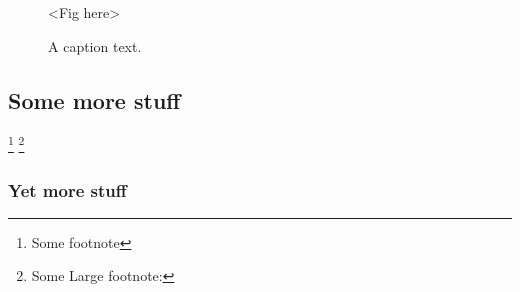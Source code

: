 \documentclass[english]{ufsc-thesis-rn46-2019}
\begin{document}
\lipsum[1]

\lipsum[1]

\begin{figure}[tb]
  \centering
  \caption{\footnotesize A caption text.}
  \label{fig:f}
  \lipsum[1]

  <Fig here> 
\end{figure}


\lipsum[1]

\lipsum[1]

\lipsum[1]

\lipsum[1]

\lipsum[1]

\subsection{Some more stuff}
\label{sec:more}

\lipsum[1] \footnote{Some footnote}
\footnote{Some Large footnote: \lipsum[4]}

\subsubsection{Yet more stuff}
\label{sec:yet-more}

\lipsum[1]

\label{sec:yet-another}

\lipsum[1]

\postextual

\end{document}
